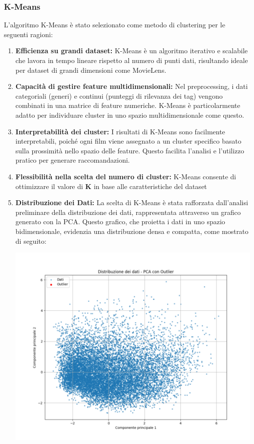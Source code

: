 \documentclass[a4paper,12pt]{article}
\begin{document}
        \subsubsection{K-Means}
	L'algoritmo K-Means è stato selezionato come metodo di clustering per le seguenti ragioni:
	\begin{enumerate}
		\item \textbf{Efficienza su grandi dataset: }K-Means è un algoritmo iterativo e scalabile che lavora in tempo lineare rispetto al numero di punti dati, risultando ideale per dataset di grandi dimensioni come MovieLens.
		\item \textbf{Capacità di gestire feature multidimensionali: }Nel preprocessing, i dati categoriali (generi) e continui (punteggi di rilevanza dei tag) vengono combinati in una matrice di feature numeriche. K-Means è particolarmente adatto per individuare cluster in uno spazio multidimensionale come questo.
		\item \textbf{Interpretabilità dei cluster: }I risultati di K-Means sono facilmente interpretabili, poiché ogni film viene assegnato a un cluster specifico basato sulla prossimità nello spazio delle feature. Questo facilita l’analisi e l’utilizzo pratico per generare raccomandazioni.
		\item \textbf{Flessibilità nella scelta del numero di cluster: }K-Means consente di ottimizzare il valore di \textbf{K} in base alle caratteristiche del dataset
\newpage
		\item \textbf{Distribuzione dei Dati: }
La scelta di K-Means è stata rafforzata dall'analisi preliminare della distribuzione dei dati, rappresentata attraverso un grafico generato con la PCA. Questo grafico, che proietta i dati in uno spazio bidimensionale, evidenzia una distribuzione densa e compatta, come mostrato di seguito:

\begin{center}
\includegraphics[]{./grafici/PCA.png}


\end{center}
\end{enumerate}
\end{document}
